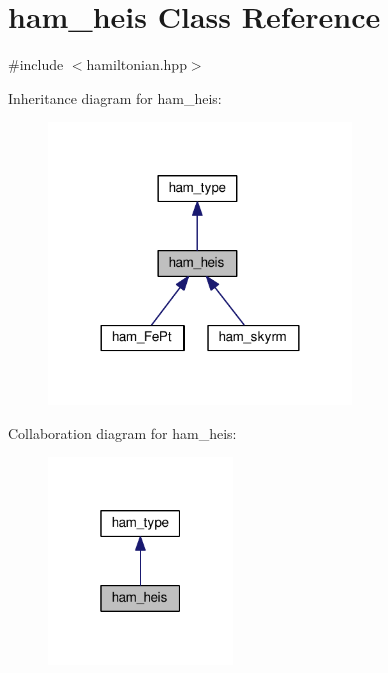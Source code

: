 \hypertarget{classham__heis}{}\section{ham\+\_\+heis Class Reference}
\label{classham__heis}


{\ttfamily \#include $<$hamiltonian.\+hpp$>$}



Inheritance diagram for ham\+\_\+heis\+:
\nopagebreak
\begin{figure}[H]
\begin{center}
\leavevmode
\includegraphics[width=228pt]{db/d7e/classham__heis__inherit__graph}
\end{center}
\end{figure}


Collaboration diagram for ham\+\_\+heis\+:
\nopagebreak
\begin{figure}[H]
\begin{center}
\leavevmode
\includegraphics[width=139pt]{d0/d9a/classham__heis__coll__graph}
\end{center}
\end{figure}
